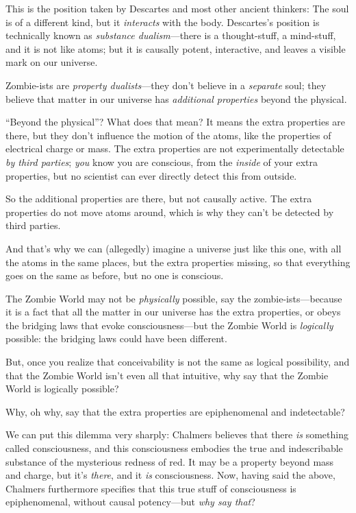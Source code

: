{
 This is the position taken by Descartes and most other ancient
thinkers: The soul is of a different kind, but it \textit{interacts}
with the body. Descartes's position is technically
known as \textit{substance dualism}{}---there is a thought-stuff, a
mind-stuff, and it is not like atoms; but it is causally potent,
interactive, and leaves a visible mark on our universe.}

{
 Zombie-ists are \textit{property dualists}{}---they
don't believe in a \textit{separate} soul; they believe
that matter in our universe has \textit{additional properties} beyond
the physical.}

{
 ``Beyond the physical''? What
does that mean? It means the extra properties are there, but they
don't influence the motion of the atoms, like the
properties of electrical charge or mass. The extra properties are not
experimentally detectable \textit{by third parties}; \textit{you} know
you are conscious, from the \textit{inside} of your extra properties,
but no scientist can ever directly detect this from outside.}

{
 So the additional properties are there, but not causally active.
The extra properties do not move atoms around, which is why they
can't be detected by third parties.}

{
 And that's why we can (allegedly) imagine a
universe just like this one, with all the atoms in the same places, but
the extra properties missing, so that everything goes on the same as
before, but no one is conscious.}

{
 The Zombie World may not be \textit{physically} possible, say the
zombie-ists---because it is a fact that all the matter in our universe
has the extra properties, or obeys the bridging laws that evoke
consciousness---but the Zombie World is \textit{logically} possible:
the bridging laws could have been different.}

{
 But, once you realize that conceivability is not the same as
logical possibility, and that the Zombie World isn't
even all that intuitive, why say that the Zombie World is logically
possible?}

{
 Why, oh why, say that the extra properties are epiphenomenal and
indetectable?}

{
 We can put this dilemma very sharply: Chalmers believes that there
\textit{is} something called consciousness, and this consciousness
embodies the true and indescribable substance of the mysterious redness
of red. It may be a property beyond mass and charge, but
it's \textit{there}, and it \textit{is} consciousness.
Now, having said the above, Chalmers furthermore specifies that this
true stuff of consciousness is epiphenomenal, without causal
potency---but \textit{why say that}?}

